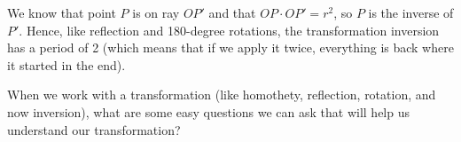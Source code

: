 









We know that point $P$ is on ray $OP'$ and that $OP \cdot OP' = r^2$, so $P$ is the inverse of $P'$.  Hence, like reflection and 180-degree rotations, the transformation inversion has a period of 2 (which means that if we apply it twice, everything is back where it started in the end).

\vspace{6pt}
When we work with a transformation (like homothety, reflection, rotation, and now inversion), what are some easy questions we can ask that will help us understand our transformation?








